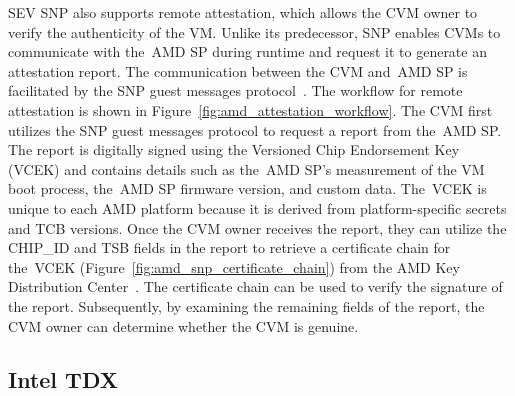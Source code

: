 SEV SNP also supports remote attestation, which allows the \acrshort{CVM} owner to verify the authenticity of the VM. Unlike its predecessor, SNP enables \acrshort{CVM}s to communicate with the~\acrshort{AMD SP} during runtime and request it to generate an attestation report. The communication between the \acrshort{CVM} and~\acrshort{AMD SP} 
is facilitated by the SNP guest messages protocol~\cite*{snp_firmware, amd_sev_summarize}. The workflow for remote attestation is shown in Figure~\ref{fig:amd_attestation_workflow}. The \acrshort{CVM} first utilizes the SNP guest messages protocol to request a report from the~\acrshort{AMD SP}. The report is digitally signed using the Versioned Chip Endorsement Key (VCEK) and 
contains details such as the~\acrshort{AMD SP}'s measurement of the VM boot process, the~\acrshort{AMD SP} firmware version, and custom data. The~\acrshort{VCEK} is unique to each AMD platform because it is derived from platform-specific secrets and TCB versions. Once the \acrshort{CVM} owner receives the report,  they can utilize the CHIP\_ID and TSB fields 
in the report to retrieve a certificate chain for the~\acrshort{VCEK} (Figure~\ref{fig:amd_snp_certificate_chain}) from the AMD Key Distribution Center~\cite*{amd_sev_summarize}. The certificate chain can be used to verify the signature of the report. Subsequently, by examining the remaining fields of the report, the \acrshort{CVM} owner can determine whether the 
\acrshort{CVM} is genuine.

\subsection{Intel TDX}
\label{subsec:tdx}

